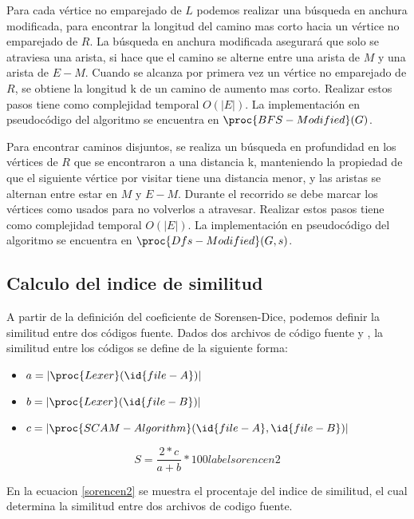 

Para cada vértice no emparejado de $L$ podemos realizar una búsqueda en anchura modificada, para encontrar la longitud del camino mas corto hacia un vértice no emparejado de $R$. La búsqueda en anchura modificada asegurará que solo se atraviesa una arista, si hace que el camino se alterne entre una arista de $M$ y una arista de $E-M$. Cuando se alcanza por primera vez un vértice no emparejado de $R$, se obtiene la longitud k de un camino de aumento mas corto. Realizar estos pasos tiene como complejidad temporal $O(|E|)$. La implementación en pseudocódigo del algoritmo se encuentra en $\proc{BFS-Modified}(G)$.



Para encontrar caminos disjuntos, se realiza un búsqueda en profundidad en los vértices de $R$ que se encontraron a una distancia k, manteniendo la propiedad de que el siguiente vértice por visitar tiene una distancia menor, y las aristas se alternan entre estar en $M$ y $E-M$. Durante el recorrido se debe marcar los vértices como usados para no volverlos a atravesar. Realizar estos pasos tiene como complejidad temporal $O(|E|)$. La implementación en pseudocódigo del algoritmo se encuentra en $\proc{Dfs-Modified}(G, s)$.



\subsection{Calculo del indice de similitud}
A partir de la definición del coeficiente de Sorensen-Dice, podemos definir la similitud entre dos códigos fuente. Dados dos archivos de código fuente  y , la similitud entre los códigos se define de la siguiente forma:
\begin{itemize}
\item[] $a = |\proc{Lexer}(\id{file-A})|$
\item[] $b = |\proc{Lexer}(\id{file-B})|$
\item[] $c = |\proc{SCAM-Algorithm}(\id{file-A},\id{file-B})|$
\end{itemize}
\begin{equation}
S=\frac{2 * c}{a + b} * 100
label{sorencen2}
\end{equation}

En la ecuacion \ref{sorencen2} se muestra el procentaje del indice de similitud, el cual determina la similitud entre dos archivos de codigo fuente.

